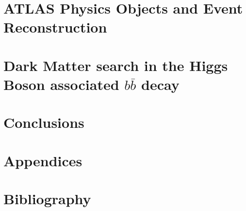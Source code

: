 \documentclass[11pt,openright,oneside,letterpaper,onecolumn]{report} %
\begin{document}
\part{ATLAS Physics Objects and Event Reconstruction}
\label{sec:performance-part}


\part{Dark Matter search in the Higgs Boson associated $b\bar{b}$ decay}
\label{sec:analysis-part}


\part{Conclusions}
\label{sec:conclusions}


\part{Appendices}
\appendix



\part{Bibliography}
\nocite{*}


\end{document}

